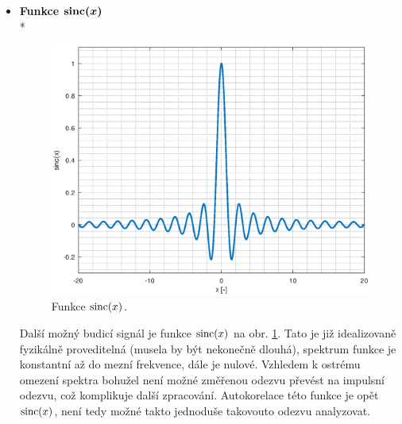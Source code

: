 \begin{itemize}
	Tento budicí signál je možné jednoduše generovat pomocí rychlých logických obvodů. Moderní logické obvody používané pro vysokorychlostní spoje (\acrshort{SATA}, \acrshort{SAS}, \acrshort{USB}\,3, \acrshort{PCI-E}) v řádu jednotek \si{\giga\bit\per\second} již mají náběžné hrany o délce kratší než 100 ps \cite{SY54017datasheet}, \cite{SN75LVCP600Sdatasheet}, \cite{SN65LVPE501datasheet}, \cite{TUSB1002Adatasheet}. Vzhledem k tomu, že pro převod skokové odezvy na impulsní je možné použít jednoduchý vztah
	\begin{equation}
	h(t)=\dv{a(t)}{t},
	\end{equation} a že je syntéza jednotkového skoku možná přímo pomocí logického obvodu, je výhodnější použít jednotkový skok než Diracovo delta. Pravděpodobně z těchto důvodů se u běžných reflektometrů používá právě jednotkový skok jako budicí signál.
	
	\item
	\textbf{Funkce $\boldsymbol{\operatorname{sinc}(x)}$}\\*	
	\begin{figure}[htbp]\includegraphics[width=\textwidth,keepaspectratio]{images/sinc.eps}\caption{Funkce $\operatorname{sinc}(x)$.}\label{sinc}\end{figure}		
	
	Další možný budicí signál je funkce $\operatorname{sinc}(x)$ na obr. \ref{sinc}. Tato je již idealizovaně fyzikálně proveditelná (musela by být nekonečně dlouhá), spektrum funkce je konstantní až do mezní frekvence, dále je nulové. Vzhledem k ostrému omezení spektra bohužel není možné změřenou odezvu převést na impulsní odezvu, což komplikuje další zpracování. Autokorelace této funkce je opět $\operatorname{sinc}(x)$, není tedy možné takto jednoduše takovouto odezvu analyzovat.
	

\end{itemize}
